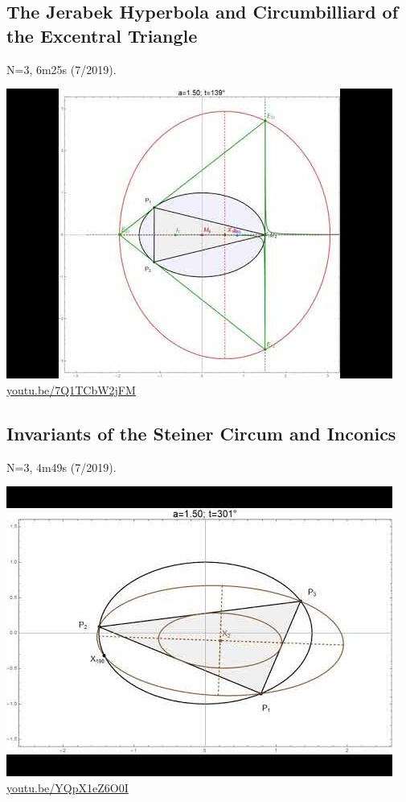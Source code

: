 \documentclass[12pt]{amsart}
\begin{document}
\subsection{The Jerabek Hyperbola and Circumbilliard of the Excentral Triangle}
\label{vid:7Q1TCbW2jFM}
\noindent N=3, 6m25s (7/2019). 
\begin{center}\includegraphics[width=.5\textwidth]{pics/7Q1TCbW2jFM.jpg} \\ 
\href{https://youtu.be/7Q1TCbW2jFM}{\url{youtu.be/7Q1TCbW2jFM}}\end{center}
% 

\subsection{Invariants of the Steiner Circum and Inconics}
\label{vid:YQpX1eZ6O0I}
\noindent N=3, 4m49s (7/2019). 
\begin{center}\includegraphics[width=.5\textwidth]{pics/YQpX1eZ6O0I.jpg} \\ 
\href{https://youtu.be/YQpX1eZ6O0I}{\url{youtu.be/YQpX1eZ6O0I}}\end{center}
% 
\end{document}
